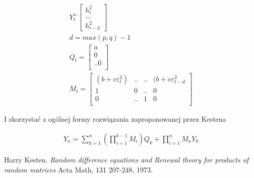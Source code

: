 \documentclass[12pt]{article}
\begin{document}
\begin{equation}
	\begin{aligned}
		Y_t^ = \begin{bmatrix}
			h_t^2 \\
			... \\
			h_{t-d}^2
		\end{bmatrix} \\
		d = max(p, q) - 1 \\
		Q_t = \begin{bmatrix}
			a \\
			0 \\
			..
			0 \\
		\end{bmatrix} \\
		M_t = \begin{bmatrix}
			(b+c\varepsilon_t^2) & .. &  .. & (b+v\varepsilon_{t-d}^2 \\
			1  & 0 & .. & 0 \\
			0 & .. & 1 & 0 \\
			\end{bmatrix}
	\end{aligned}
\end{equation}

I skorzystać z ogólnej formy rozwiązania zaproponowanej przez Kestena

\begin{equation}
	\begin{aligned}
		Y_n = \sum_{k=1}^n (\prod_{i=1}^{k-1} M_i) Q_k + \prod_{i=1}^n M_n Y_0
	\end{aligned}
\end{equation}


\begin{thebibliography}{9}
Harry Kesten. 
\textit{Random difference equations and Renewal theory for products of random matrices}
Acta Math, 131 207-248, 1973.
\end{thebibliography}
\end{document}
